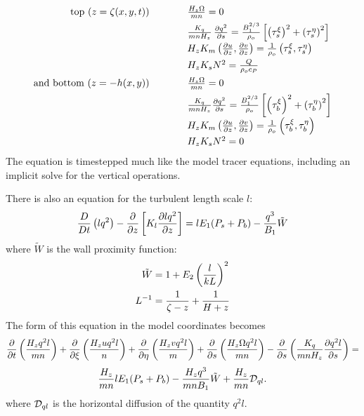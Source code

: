 \[
\begin{array}{rl}
  \mbox{top ($z = \zeta(x,y,t))$} \hspace{1cm}
  & {H_z \Omega \over mn} = 0 \\ [1.5mm]
  & {K_q \over mn H_z} \, \frac{\partial q^2}{\partial s}
    = {B_1^{2/3} \over \rho_o} \left[ \left( \tau_s^\xi \right)^2
    + \left( \tau_s^\eta \right)^2  \right] \\ [1.5mm]
  & H_z K_m \left( {\partial u \over \partial z},
    {\partial v \over \partial z} \right) = {1 \over \rho_o}
    \left( \tau_s^\xi, \tau_s^\eta \right) \\ [1.5mm]
  & H_z K_s N^2 = {Q \over \rho_o c_P} \\[2mm]
  \mbox{and bottom ($z = -h(x,y)$)} \hspace{1cm} &
    {H_z \Omega \over mn} = 0 \\[1.5mm]
  & {K_q \over mnH_z} {\partial q^2 \over \partial s}
    = {B_1^{2/3} \over \rho_o} \left[ \left( \tau_b^\xi \right)^2
    + \left( \tau_b^\eta \right)^2  \right] \\ [1.5mm]
  & H_z K_m \left( {\partial u \over \partial z},
    {\partial v \over \partial z} \right) = {1 \over \rho_o}
    \left( \tau_b^\xi, \tau_b^\eta \right) \\ [1.5mm]
  & H_z K_s N^2 = 0
\end{array}
\]
The equation is timestepped much like the model tracer equations,
including an implicit solve for the vertical operations.

There is also an equation for the turbulent length scale $l$:
\begin{equation}
  {D \over Dt} \left( {lq^2} \right) -
  {\partial \over \partial z} \left[ K_l
  {\partial lq^2 \over \partial z} 
  \right] = lE_1 ( P_s + P_b ) - {q^3 \over B_1} \tilde{W}
\end{equation}
where $\tilde{W}$ is the wall proximity function:
\begin{align}
  \tilde{W} &= 1 + E_2 \left( {l \over kL} \right) ^2 \\
  L^{-1} &= {1 \over \zeta -z} + {1 \over H+z}
\end{align}
The form of this equation in the model coordinates becomes
{\samepage
\[
  {\partial \over \partial t} \left( {H_z q^2l \over mn} \right) +
  {\partial \over \partial \xi} \left( {H_z u q^2l \over n} \right) +
  {\partial \over \partial \eta} \left( {H_z v q^2l \over m} \right) +
  {\partial \over \partial s} \left( {H_z \Omega q^2l \over mn} \right) -
  {\partial \over \partial s} \left( {K_q \over mnH_z}
  {\partial q^2l \over \partial s} \right) =
\]
\begin{equation}
  {H_z \over mn} lE_1 ( P_s + P_b) - 
  {H_z q^3 \over mnB_1 } \tilde{W} +
  {H_z \over mn} {\cal D}_{ql} .
\end{equation}
}
where ${\cal D}_{ql}$ is the horizontal diffusion of the quantity
$q^2l$.

